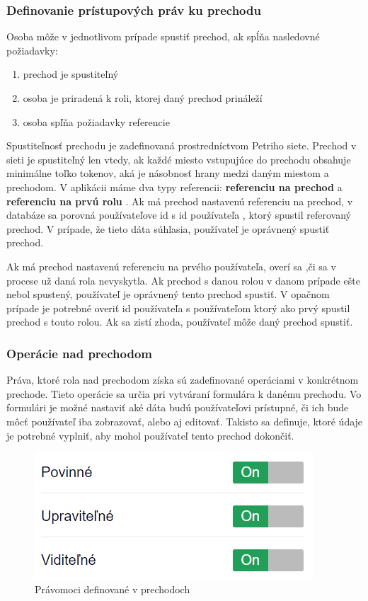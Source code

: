 \subsubsection{Definovanie prístupových práv ku prechodu}

Osoba môže v jednotlivom prípade spustiť prechod, ak spĺňa nasledovné požiadavky:
\begin{enumerate}
	\item prechod je spustiteľný
	\item osoba je priradená k roli, ktorej daný prechod prináleží
	\item osoba spľňa požiadavky referencie
\end{enumerate}

Spustiteľnosť prechodu je zadefinovaná prostredníctvom Petriho siete. Prechod v sieti je spustiteľný len vtedy, ak každé  miesto vstupujúce do prechodu obsahuje minimálne toľko tokenov, aká je násobnosť hrany medzi daným miestom a prechodom.
V aplikácii máme dva typy referencii: \textbf{referenciu na prechod} a \textbf{referenciu na prvú rolu} .
Ak má prechod nastavenú referenciu na prechod, v databáze sa porovná používateľove id s id používateľa , ktorý spustil referovaný prechod. V prípade, že tieto dáta súhlasia, používateľ je oprávnený spustiť prechod.

Ak má prechod nastavenú referenciu na prvého používateľa, overí sa ,či sa v procese už daná rola nevyskytla. Ak prechod s danou rolou v danom prípade ešte nebol spustený, používateľ je oprávnený tento prechod spustiť. V opačnom prípade je potrebné overiť id používateľa s používateľom ktorý ako prvý spustil prechod s touto rolou. Ak sa zistí zhoda, používateľ môže daný prechod spustiť.



\subsubsection{Operácie nad prechodom}	
Práva, ktoré rola nad prechodom získa sú zadefinované operáciami v konkrétnom prechode. Tieto operácie sa určia pri vytváraní formulára k danému prechodu.  
Vo formulári je možné nastaviť aké dáta budú používateľovi prístupné, či ich bude môcť používateľ iba zobrazovať, alebo aj editovať. Takisto sa definuje, ktoré údaje je potrebné vyplniť, aby mohol používateľ tento prechod dokončiť.

\begin{figure}[h]
	\centering
	\includegraphics[width=0.4\linewidth]{images/formulare_opravnenia}
	\caption{ Právomoci definované v prechodoch }
	\label{fig:roles_permissions}
\end{figure}



